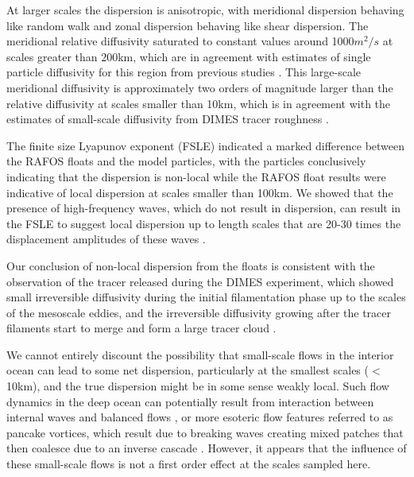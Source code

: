 \documentclass[]{ametsoc}
\begin{document}
At larger scales the dispersion is anisotropic, with meridional dispersion behaving like random walk and zonal dispersion behaving like shear dispersion. The meridional relative diffusivity saturated to constant values around 1000$m^2/s$ at scales greater than 200km, which are in agreement with estimates of single particle diffusivity for this region from previous studies \citep{lacasce2014, balwada2016, tulloch2014direct}. This large-scale meridional diffusivity is approximately two orders of magnitude larger than the relative diffusivity at scales smaller than 10km, which is in agreement with the estimates of small-scale diffusivity from DIMES tracer roughness \citep{boland2015}.

The finite size Lyapunov exponent (FSLE) indicated a marked difference between the RAFOS floats and the model particles, with the particles conclusively indicating that the dispersion is non-local while the RAFOS float results were indicative of local dispersion at scales smaller than 100km. We showed that the presence of high-frequency waves, which do not result in dispersion, can result in the FSLE to suggest local dispersion up to length scales that are 20-30 times the displacement amplitudes of these waves \citep{haza2014does, vera2016}.


Our conclusion of non-local dispersion from the floats is consistent with the observation of the tracer released during the DIMES experiment, which showed small irreversible diffusivity during the initial filamentation phase up to the scales of the mesoscale eddies, and the irreversible diffusivity growing after the tracer filaments start to merge and form a large tracer cloud \citep{zika2020}.

We cannot entirely discount the possibility that small-scale flows in the interior ocean can lead to some net dispersion, particularly at the smallest scales ($<$10km), and the true dispersion might be in some sense weakly local. Such flow dynamics in the deep ocean can potentially result from interaction between internal waves and balanced flows \citep{thomas2019geophysical}, or more esoteric flow features referred to as pancake vortices, which result due to breaking waves creating mixed patches that then coalesce due to an inverse cascade \citep{sundermeyer2005stirring, polzin2004isopycnal}. However, it appears that the influence of these small-scale flows is not a first order effect at the scales sampled here.
\end{document}
